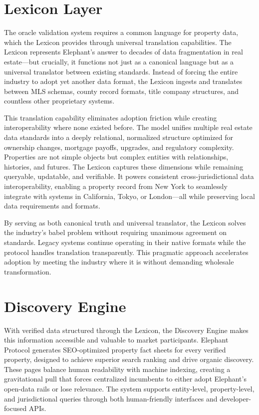 \section{Lexicon Layer}

The oracle validation system requires a common language for property data, which the Lexicon provides through universal translation capabilities. The Lexicon represents Elephant's answer to decades of data fragmentation in real estate---but crucially, it functions not just as a canonical language but as a universal translator between existing standards. Instead of forcing the entire industry to adopt yet another data format, the Lexicon ingests and translates between MLS schemas, county record formats, title company structures, and countless other proprietary systems.

This translation capability eliminates adoption friction while creating interoperability where none existed before. The model unifies multiple real estate data standards into a deeply relational, normalized structure optimized for ownership changes, mortgage payoffs, upgrades, and regulatory complexity. Properties are not simple objects but complex entities with relationships, histories, and futures. The Lexicon captures these dimensions while remaining queryable, updatable, and verifiable. It powers consistent cross-jurisdictional data interoperability, enabling a property record from New York to seamlessly integrate with systems in California, Tokyo, or London---all while preserving local data requirements and formats.

By serving as both canonical truth and universal translator, the Lexicon solves the industry's babel problem without requiring unanimous agreement on standards. Legacy systems continue operating in their native formats while the protocol handles translation transparently. This pragmatic approach accelerates adoption by meeting the industry where it is without demanding wholesale transformation.

\section{Discovery Engine}

With verified data structured through the Lexicon, the Discovery Engine makes this information accessible and valuable to market participants. Elephant Protocol generates SEO-optimized property fact sheets for every verified property, designed to achieve superior search ranking and drive organic discovery. These pages balance human readability with machine indexing, creating a gravitational pull that forces centralized incumbents to either adopt Elephant's open-data rails or lose relevance. The system supports entity-level, property-level, and jurisdictional queries through both human-friendly interfaces and developer-focused APIs.

